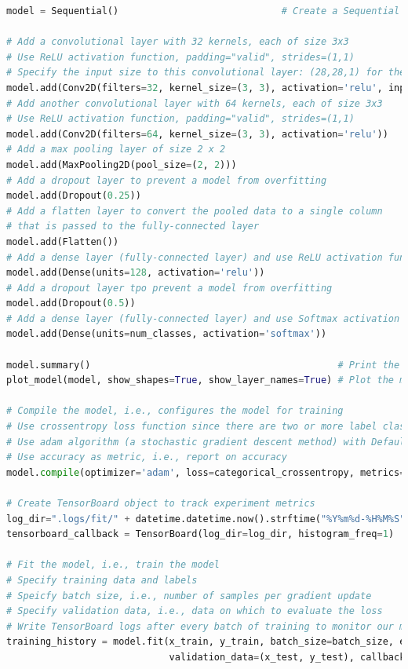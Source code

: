 \documentclass{book}
\begin{document}
\begin{lstlisting}[language=Python, basicstyle=\ttfamily\small, keywordstyle=\color{blue}, commentstyle=\color{forestgreen}, stringstyle=\color{red}, showstringspaces=false]
model = Sequential()                             # Create a Sequential object

# Add a convolutional layer with 32 kernels, each of size 3x3
# Use ReLU activation function, padding="valid", strides=(1,1)
# Specify the input size to this convolutional layer: (28,28,1) for the first layer only
model.add(Conv2D(filters=32, kernel_size=(3, 3), activation='relu', input_shape=(28,28,1)))
# Add another convolutional layer with 64 kernels, each of size 3x3
# Use ReLU activation function, padding="valid", strides=(1,1)
model.add(Conv2D(filters=64, kernel_size=(3, 3), activation='relu'))
# Add a max pooling layer of size 2 x 2
model.add(MaxPooling2D(pool_size=(2, 2)))
# Add a dropout layer to prevent a model from overfitting
model.add(Dropout(0.25))
# Add a flatten layer to convert the pooled data to a single column
# that is passed to the fully-connected layer
model.add(Flatten())
# Add a dense layer (fully-connected layer) and use ReLU activation function
model.add(Dense(units=128, activation='relu'))
# Add a dropout layer tpo prevent a model from overfitting
model.add(Dropout(0.5))
# Add a dense layer (fully-connected layer) and use Softmax activation function
model.add(Dense(units=num_classes, activation='softmax'))

model.summary()                                            # Print the model summary
plot_model(model, show_shapes=True, show_layer_names=True) # Plot the model

# Compile the model, i.e., configures the model for training
# Use crossentropy loss function since there are two or more label classes.
# Use adam algorithm (a stochastic gradient descent method) with Default learning rate = 0.001
# Use accuracy as metric, i.e., report on accuracy
model.compile(optimizer='adam', loss=categorical_crossentropy, metrics=['accuracy'])

# Create TensorBoard object to track experiment metrics
log_dir=".logs/fit/" + datetime.datetime.now().strftime("%Y%m%d-%H%M%S")
tensorboard_callback = TensorBoard(log_dir=log_dir, histogram_freq=1)

# Fit the model, i.e., train the model
# Specify training data and labels
# Speicfy batch size, i.e., number of samples per gradient update
# Specify validation data, i.e., data on which to evaluate the loss
# Write TensorBoard logs after every batch of training to monitor our metrices
training_history = model.fit(x_train, y_train, batch_size=batch_size, epochs=epochs,
                             validation_data=(x_test, y_test), callbacks=[tensorboard_callback])


\end{lstlisting}
\end{document}
